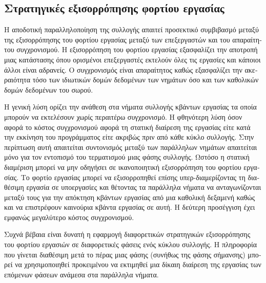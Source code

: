 \begin{greek}
\subsection{Στρατηγικές εξισορρόπησης φορτίου εργασίας}
Η αποδοτική παραλληλοποίηση της συλλογής απαιτεί προσεκτικό
συμβιβασμό μεταξύ της εξισορρόπησης του φορτίου εργασίας
μεταξύ των επεξεργαστών και του απαραίτητου συγχρονισμού.
Η εξισορρόπηση του φορτίου εργασίας εξασφαλίζει την αποτροπή
μιας κατάστασης όπου ορισμένοι επεξεργαστές εκτελούν όλες
τις εργασίες και κάποιοι άλλοι είναι αδρανείς. Ο συγχρονισμός
είναι απαραίτητος καθώς εξασφαλίζει την ακεραιότητα τόσο των
ιδιωτικών δομών δεδομένων των νημάτων όσο και των καθολικών
δομών δεδομένων του σωρού.
 
Η γενική λύση ορίζει την ανάθεση στα νήματα συλλογής κβάντων
εργασίας τα οποία μπορούν να εκτελέσουν χωρίς περαιτέρω
συγχρονισμό. Η φθηνότερη λύση όσον αφορά το κόστος συγχρονισμού
αφορά τη στατική διαίρεση της εργασίας είτε κατά την εκκίνηση
του προγράμματος είτε ακριβώς πριν από κάθε κύκλο συλλογής.
Στην περίπτωση αυτή απαιτείται συντονισμός μεταξύ των παράλληλων
νημάτων απαιτείται μόνο για τον εντοπισμό του τερματισμού μιας
φάσης συλλογής. Ωστόσο η στατική διαμέριση μπορεί να μην οδηγήσει
σε ικανοποιητική εξισορρόπηση του φορτίου εργασίας. Το φορτίο
εργασίας μπορεί να εξισορροπηθεί επίσης υπερ-διαμερίζοντας
τη διαθέσιμη εργασία σε υποεργασίες και θέτοντας τα παράλληλα
νήματα να ανταγωνίζονται μεταξύ τους για την απόκτηση κβάντων
εργασίας από μια καθολική δεξαμενή καθώς και να επιστρέφουν
καινούρια κβάντα εργασίας σε αυτή. Η δεύτερη προσέγγιση έχει
εμφανώς μεγαλύτερο κόστος συγχρονισμού.

Συχνά βέβαια είναι δυνατή η εφαρμογή διαφορετικών στρατηγικών
εξισορρόπησης του φορτίου εργασιών σε διαφορετικές φάσεις ενός
κύκλου συλλογής. Η πληροφορία που γίνεται διαθέσιμη μετά το
πέρας μιας φάσης (συνήθως της φάσης σήμανσης) μπορεί να χρησιμοποιηθεί
προκειμένου να εκτιμηθεί μια δίκαιη διαίρεση της εργασίας των
επόμενων φάσεων ανάμεσα στα παράλληλα νήματα.
 

\end{greek}
